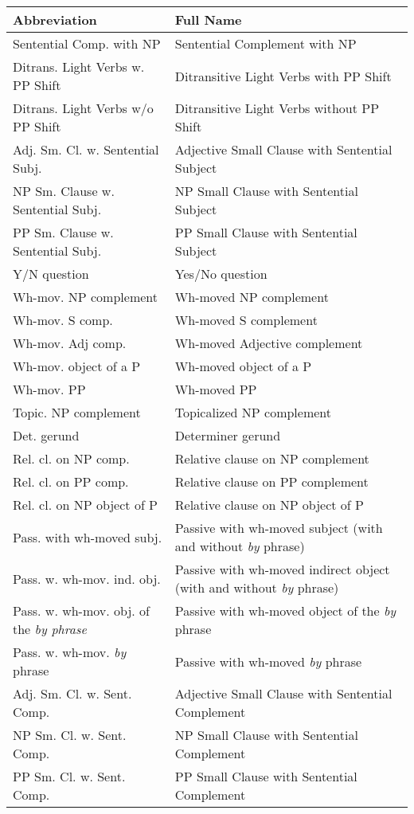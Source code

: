 \small
\begin{tabular}{ll}
Abbreviation&Full Name\\
\hline
Sentential Comp. with NP&Sentential Complement with NP\\
Ditrans. Light Verbs w. PP Shift&Ditransitive Light Verbs with PP Shift\\
Ditrans. Light Verbs w/o PP Shift&Ditransitive Light Verbs without PP Shift\\
Adj. Sm. Cl. w. Sentential Subj.&Adjective Small Clause with Sentential Subject\\
NP Sm. Clause w. Sentential Subj.&NP Small Clause with Sentential Subject\\
PP Sm. Clause w. Sentential Subj.&PP Small Clause with Sentential Subject\\
Y/N question&Yes/No question \\
Wh-mov. NP complement&Wh-moved NP complement \\
Wh-mov. S comp.&Wh-moved S complement \\
Wh-mov. Adj comp.&Wh-moved Adjective complement \\
Wh-mov. object of a P&Wh-moved object of a P \\
Wh-mov. PP&Wh-moved PP \\
Topic. NP complement&Topicalized NP complement \\
Det. gerund&Determiner gerund \\
Rel. cl. on NP comp.&Relative clause on NP complement \\
Rel. cl. on PP comp.& Relative clause on PP complement\\
Rel. cl. on NP object of P& Relative clause on NP object of P\\
Pass. with wh-moved subj.&Passive with wh-moved subject (with and without {\it by} phrase) \\
Pass. w. wh-mov. ind. obj.&Passive with wh-moved indirect object (with and without {\it by} phrase) \\
Pass. w. wh-mov. obj. of the {\it {\it by} phrase}&Passive with wh-moved object of the {\it by} phrase \\
Pass. w. wh-mov. {\it by} phrase&Passive with wh-moved {\it by} phrase \\
Adj. Sm. Cl. w. Sent. Comp.&Adjective Small Clause with Sentential
Complement\\
NP Sm. Cl. w. Sent. Comp.&NP Small Clause with Sentential Complement\\
PP Sm. Cl. w. Sent. Comp.&PP Small Clause with Sentential Complement\\

\end{tabular}
